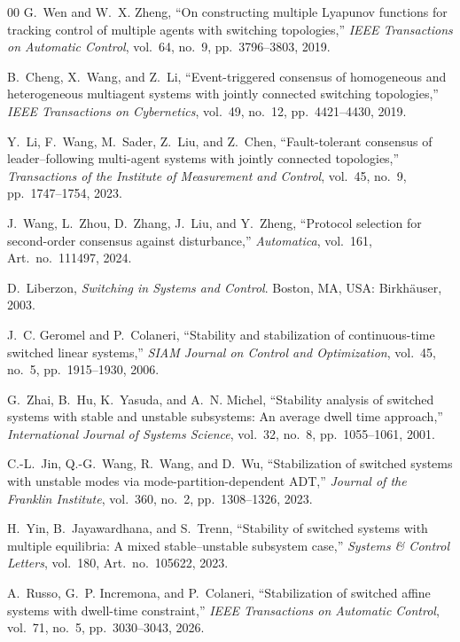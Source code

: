 \documentclass[conference]{IEEEtran}
\begin{document}
\begin{thebibliography}{00}
		G.~Wen and W.~X. Zheng,
		``On constructing multiple Lyapunov functions for tracking
		control of multiple agents with switching topologies,''
		\emph{IEEE Transactions on Automatic Control},
		vol.~64, no.~9, pp.~3796--3803, 2019.
		
		
		
		B.~Cheng, X.~Wang, and Z.~Li,
		``Event-triggered consensus of homogeneous and heterogeneous
		multiagent systems with jointly connected switching topologies,''
		\emph{IEEE Transactions on Cybernetics},
		vol.~49, no.~12, pp.~4421--4430, 2019.
		
		Y.~Li, F.~Wang, M.~Sader, Z.~Liu, and Z.~Chen,
		``Fault-tolerant consensus of leader--following multi-agent systems
		with jointly connected topologies,''
		\emph{Transactions of the Institute of Measurement and Control},
		vol.~45, no.~9, pp.~1747--1754, 2023.
		
		J.~Wang, L.~Zhou, D.~Zhang, J.~Liu, and Y.~Zheng,
		``Protocol selection for second-order consensus against
		disturbance,''
		\emph{Automatica},
		vol.~161, Art.~no.~111497, 2024.
		
		D.~Liberzon,
		\emph{Switching in Systems and Control}.
		Boston, MA, USA: Birkh\"auser, 2003.
		
		J.~C. Geromel and P.~Colaneri,
		``Stability and stabilization of continuous-time switched linear
		systems,''
		\emph{SIAM Journal on Control and Optimization},
		vol.~45, no.~5, pp.~1915--1930, 2006.
		
		G.~Zhai, B.~Hu, K.~Yasuda, and A.~N. Michel,
		``Stability analysis of switched systems with stable and unstable
		subsystems: An average dwell time approach,''
		\emph{International Journal of Systems Science},
		vol.~32, no.~8, pp.~1055--1061, 2001.
		
		C.-L.~Jin, Q.-G.~Wang, R.~Wang, and D.~Wu,
		``Stabilization of switched systems with unstable modes via
		mode-partition-dependent ADT,''
		\emph{Journal of the Franklin Institute},
		vol.~360, no.~2, pp.~1308--1326, 2023.
		
		H.~Yin, B.~Jayawardhana, and S.~Trenn,
		``Stability of switched systems with multiple equilibria:
		A mixed stable--unstable subsystem case,''
		\emph{Systems \& Control Letters},
		vol.~180, Art.~no.~105622, 2023.
		
		A.~Russo, G.~P. Incremona, and P.~Colaneri,
		``Stabilization of switched affine systems with dwell-time
		constraint,''
		\emph{IEEE Transactions on Automatic Control},
		vol.~71, no.~5, pp.~3030--3043, 2026.
		

\end{thebibliography}
\end{document}
